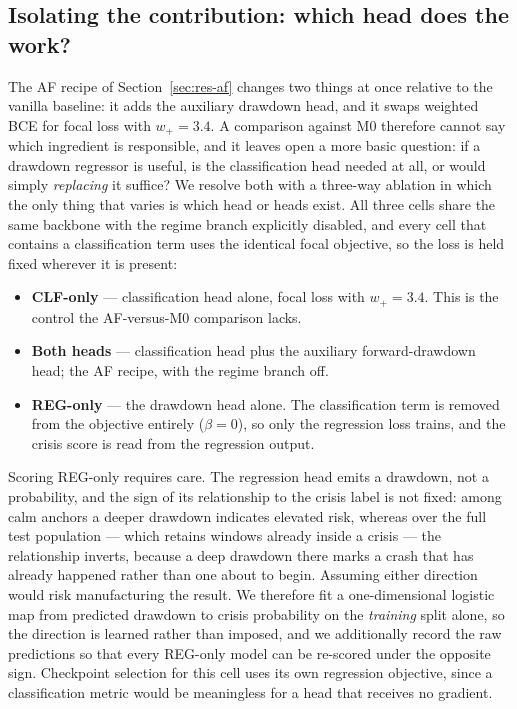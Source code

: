 \documentclass[11pt,a4paper]{article}
\begin{document}
\subsection{Isolating the contribution: which head does the work?}
\label{sec:res-heads}
The AF recipe of Section~\ref{sec:res-af} changes two things at once relative
to the vanilla baseline: it adds the auxiliary drawdown head, and it swaps
weighted BCE for focal loss with $w_{+}=3.4$. A comparison against M0
therefore cannot say which ingredient is responsible, and it leaves open a
more basic question: if a drawdown regressor is useful, is the classification
head needed at all, or would simply \emph{replacing} it suffice? We resolve
both with a three-way ablation in which the only thing that varies is which
head or heads exist. All three cells share the same backbone with the regime
branch explicitly disabled, and every cell that contains a classification term
uses the identical focal objective, so the loss is held fixed wherever it is
present:

\begin{itemize}\itemsep2pt
\item \textbf{CLF-only} --- classification head alone, focal loss with
      $w_{+}=3.4$. This is the control the AF-versus-M0 comparison lacks.
\item \textbf{Both heads} --- classification head plus the auxiliary
      forward-drawdown head; the AF recipe, with the regime branch off.
\item \textbf{REG-only} --- the drawdown head alone. The classification term is
      removed from the objective entirely ($\beta=0$), so only the regression
      loss trains, and the crisis score is read from the regression output.
\end{itemize}

Scoring REG-only requires care. The regression head emits a drawdown, not a
probability, and the sign of its relationship to the crisis label is not fixed:
among calm anchors a deeper drawdown indicates elevated risk, whereas over the
full test population --- which retains windows already inside a crisis --- the
relationship inverts, because a deep drawdown there marks a crash that has
already happened rather than one about to begin. Assuming either direction
would risk manufacturing the result. We therefore fit a one-dimensional
logistic map from predicted drawdown to crisis probability on the
\emph{training} split alone, so the direction is learned rather than imposed,
and we additionally record the raw predictions so that every REG-only model can
be re-scored under the opposite sign. Checkpoint selection for this cell uses
its own regression objective, since a classification metric would be
meaningless for a head that receives no gradient.
\end{document}
